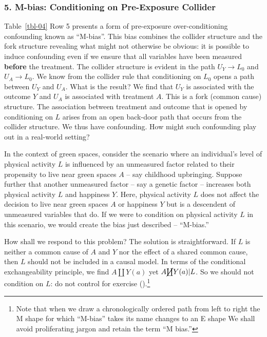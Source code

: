 \documentclass[
  singlecolumn]{article}
\begin{document}
\subsubsection{5. M-bias: Conditioning on Pre-Exposure
Collider}\label{m-bias-conditioning-on-pre-exposure-collider}

Table~\ref{tbl-04} Row 5 presents a form of pre-exposure
over-conditioning confounding known as ``M-bias''. This bias combines
the collider structure and the fork structure revealing what might not
otherwise be obvious: it is possible to induce confounding even if we
ensure that all variables have been measured \textbf{before} the
treatment. The collider structure is evident in the path \(U_Y \to L_0\)
and \(U_A \to L_0\). We know from the collider rule that conditioning on
\(L_0\) opens a path between \(U_Y\) and \(U_A\). What is the result? We
find that \(U_Y\) is associated with the outcome \(Y\) and \(U_A\) is
associated with treatment \(A\). This is a fork (common cause)
structure. The association between treatment and outcome that is opened
by conditioning on \(L\) arises from an open back-door path that occurs
from the collider structure. We thus have confounding. How might such
confounding play out in a real-world setting?

In the context of green spaces, consider the scenario where an
individual's level of physical activity \(L\) is influenced by an
unmeasured factor related to their propensity to live near green spaces
\(A\) -- say childhood upbringing. Suppose further that another
unmeasured factor -- say a genetic factor -- increases both physical
activity \(L\) and happiness \(Y\). Here, physical activity \(L\) does
not affect the decision to live near green spaces \(A\) or happiness
\(Y\) but is a descendent of unmeasured variables that do. If we were to
condition on physical activity \(L\) in this scenario, we would create
the bias just described -- ``M-bias.''

How shall we respond to this problem? The solution is straightforward.
If \(L\) is neither a common cause of \(A\) and \(Y\) nor the effect of
a shared common cause, then \(L\) should not be included in a causal
model. In terms of the conditional exchangeability principle, we find
\(A \coprod Y(a)\) yet \(A \cancel{\coprod} Y(a)| L\). So we should not
condition on \(L\): do not control for exercise
().\footnote{Note that
  when we draw a chronologically ordered path from left to right the M
  shape for which ``M-bias'' takes its name changes to an E shape We
  shall avoid proliferating jargon and retain the term ``M bias.''}
\end{document}

